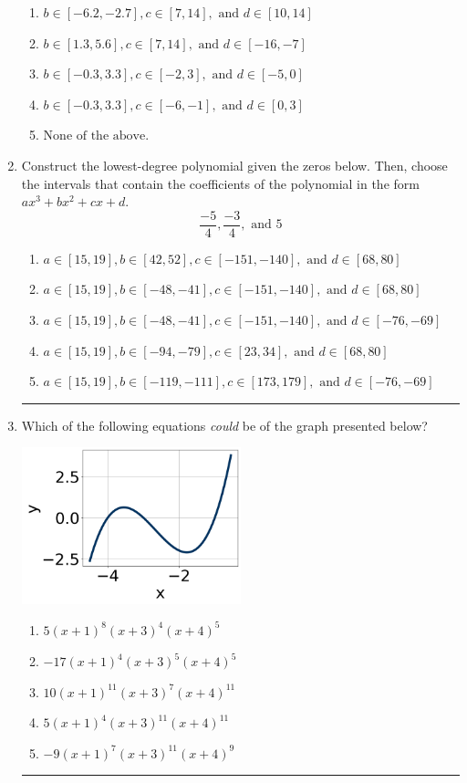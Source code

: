 \documentclass[14pt]{extbook}
\newcommand{\litem}[1]{\item#1\hspace*{-1cm}\rule{\textwidth}{0.4pt}}
\begin{document}
\begin{enumerate}
{\begin{enumerate}[label=\Alph*.]
\item \( b \in [-6.2, -2.7], c \in [7, 14], \text{ and } d \in [10, 14] \)
\item \( b \in [1.3, 5.6], c \in [7, 14], \text{ and } d \in [-16, -7] \)
\item \( b \in [-0.3, 3.3], c \in [-2, 3], \text{ and } d \in [-5, 0] \)
\item \( b \in [-0.3, 3.3], c \in [-6, -1], \text{ and } d \in [0, 3] \)
\item \( \text{None of the above.} \)

\end{enumerate} }
\litem{
Construct the lowest-degree polynomial given the zeros below. Then, choose the intervals that contain the coefficients of the polynomial in the form $ax^3+bx^2+cx+d$.\[ \frac{-5}{4}, \frac{-3}{4}, \text{ and } 5 \]\begin{enumerate}[label=\Alph*.]
\item \( a \in [15, 19], b \in [42, 52], c \in [-151, -140], \text{ and } d \in [68, 80] \)
\item \( a \in [15, 19], b \in [-48, -41], c \in [-151, -140], \text{ and } d \in [68, 80] \)
\item \( a \in [15, 19], b \in [-48, -41], c \in [-151, -140], \text{ and } d \in [-76, -69] \)
\item \( a \in [15, 19], b \in [-94, -79], c \in [23, 34], \text{ and } d \in [68, 80] \)
\item \( a \in [15, 19], b \in [-119, -111], c \in [173, 179], \text{ and } d \in [-76, -69] \)

\end{enumerate} }
\litem{
Which of the following equations \textit{could} be of the graph presented below?
\begin{center}
    \includegraphics[width=0.5\textwidth]{../Figures/polyGraphToFunctionA.png}
\end{center}
\begin{enumerate}[label=\Alph*.]
\item \( 5(x + 1)^{8} (x + 3)^{4} (x + 4)^{5} \)
\item \( -17(x + 1)^{4} (x + 3)^{5} (x + 4)^{5} \)
\item \( 10(x + 1)^{11} (x + 3)^{7} (x + 4)^{11} \)
\item \( 5(x + 1)^{4} (x + 3)^{11} (x + 4)^{11} \)
\item \( -9(x + 1)^{7} (x + 3)^{11} (x + 4)^{9} \)

\end{enumerate} }
\end{enumerate}
\end{document}
